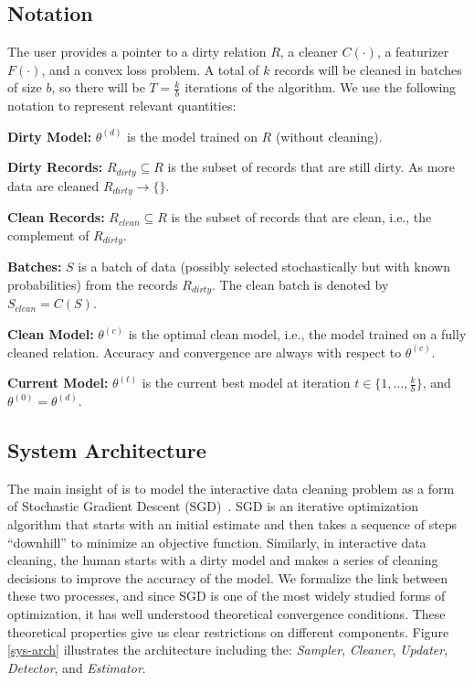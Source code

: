 \subsection{Notation}\label{notation}
The user provides a pointer to a dirty relation $R$, a cleaner $C(\cdot)$, a featurizer $F(\cdot)$, and a convex loss problem.
A total of $k$ records will be cleaned in batches of size $b$, so there will be $T = \frac{k}{b}$ iterations of the algorithm.  
We use the following notation to represent relevant quantities:

\vspace{0.25em}

\noindent\textbf{Dirty Model: } $\theta^{(d)}$ is the model trained on $R$ (without cleaning). 

\vspace{0.25em}

\noindent\textbf{Dirty Records: } $R_{dirty} \subseteq R$ is the subset of records that are still dirty. As more data are cleaned $R_{dirty} \rightarrow \{\}$.

\vspace{0.25em}

\noindent\textbf{Clean Records: } $R_{clean} \subseteq R$ is the subset of records that are clean, i.e., the complement of $R_{dirty}$.

\vspace{0.25em}

\noindent\textbf{Batches: } $S$ is a batch of data (possibly selected stochastically but with known probabilities) from the records $R_{dirty}$. The clean batch is denoted by $S_{clean} = C(S)$.

\vspace{0.25em}

\noindent\textbf{Clean Model: } $\theta^{(c)}$ is the optimal clean model, i.e., the model trained on a fully cleaned relation. Accuracy and convergence are always with respect to $\theta^{(c)}$.

\noindent\textbf{Current Model: } $\theta^{(t)}$ is the current best model at iteration $t \in \{1,...,\frac{k}{b}\}$, and $\theta^{(0)} = \theta^{(d)}$. 


\subsection{System Architecture}\label{syarch}
The main insight of \sys is to model the interactive data cleaning problem as a form of Stochastic Gradient Descent (SGD)~\cite{bottou2012stochastic}.
SGD is an iterative optimization algorithm that starts with an initial estimate and then takes a sequence of steps ``downhill'' to minimize an objective function.
Similarly, in interactive data cleaning, the human starts with a dirty model and makes a series of cleaning decisions to improve the accuracy of the model.
We formalize the link between these two processes, and since SGD is one of the most widely studied forms of optimization, it has well understood theoretical convergence conditions.
These theoretical properties give us clear restrictions on different components.
Figure \ref{sys-arch} illustrates the \sys architecture including the: {\it Sampler}, {\it Cleaner}, \emph{Updater}, {\it Detector}, and {\it Estimator}.

